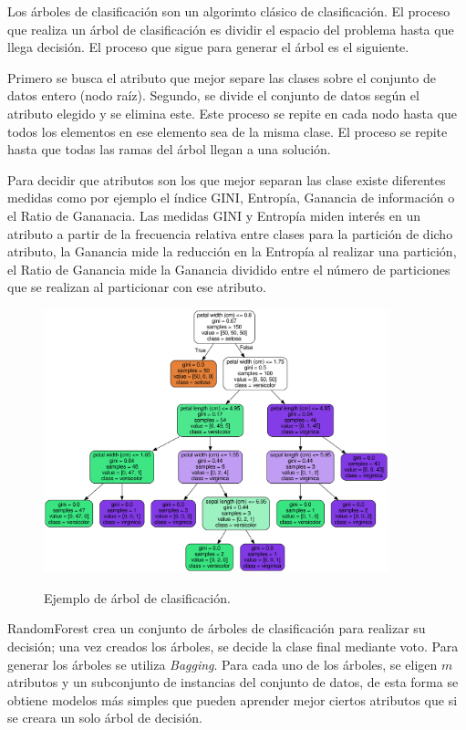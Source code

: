 Los árboles de clasificación son un algorimto clásico de clasificación. El proceso que realiza un árbol de clasificación es dividir el espacio del problema hasta que llega decisión. El proceso que sigue para generar el árbol es el siguiente.\newline

Primero se busca el atributo que mejor separe las clases sobre el conjunto de datos entero (nodo raíz). Segundo, se divide el conjunto de datos según el atributo elegido y se elimina este. Este proceso se repite en cada nodo hasta que todos los elementos en ese elemento sea de la misma clase. El proceso se repite hasta que todas las ramas del árbol llegan a una solución.\newline

Para decidir que atributos son los que mejor separan las clase existe diferentes medidas como por ejemplo el índice GINI, Entropía, Ganancia de información o el Ratio de Gananacia. Las medidas GINI y Entropía miden interés en un atributo a partir de la frecuencia relativa entre clases para la partición de dicho atributo, la Ganancia mide la reducción en la Entropía al realizar una partición, el Ratio de Ganancia mide la Ganancia dividido entre el número de particiones que se realizan al particionar con ese atributo.\newline
\newpage
\begin{figure}[h]
	\centering
	\includegraphics[width=100mm]{imagenes/tree_example.png}
	\label{fig:216}
	\caption{Ejemplo de árbol de clasificación.}
\end{figure}
\verticalspace

RandomForest crea un conjunto de árboles de clasificación para realizar su decisión; una vez creados los árboles, se decide la clase final mediante voto. Para generar los árboles se utiliza \textit{Bagging}. Para cada uno de los árboles, se eligen $m$ atributos y un subconjunto de instancias del conjunto de datos, de esta forma se obtiene modelos más simples que pueden aprender mejor ciertos atributos que si se creara un solo árbol de decisión.\newline

